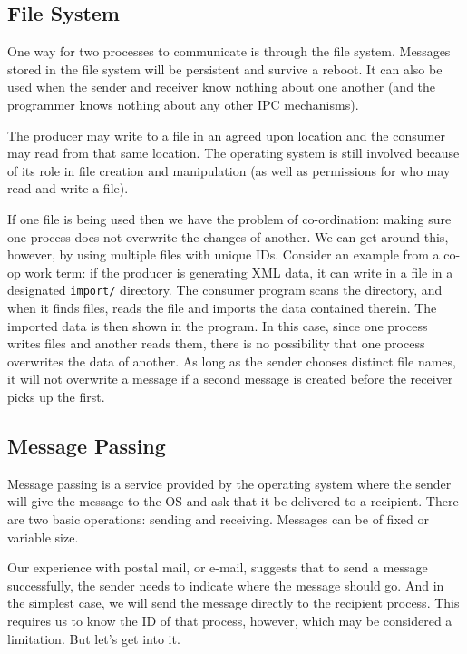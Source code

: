 \subsection*{File System}

One way for two processes to communicate is through the file system. Messages stored in the file system will be persistent and survive a reboot. It can also be used when the sender and receiver know nothing about one another (and the programmer knows nothing about any other IPC mechanisms).

The producer may write to a file in an agreed upon location and the consumer may read from that same location. The operating system is still involved because of its role in file creation and manipulation (as well as permissions for who may read and write a file).

If one file is being used then we have the problem of co-ordination: making sure one process does not overwrite the changes of another. We can get around this, however, by using multiple files with unique IDs. Consider an example from a co-op work term: if the producer is generating XML data, it can write in a file in a designated \texttt{import/} directory. The consumer program scans the directory, and when it finds files, reads the file and imports the data contained therein. The imported data is then shown in the program. In this case, since one process writes files and another reads them, there is no possibility that one process overwrites the data of another. As long as the sender chooses distinct file names, it will not overwrite a message if a second message is created before the receiver picks up the first.

\subsection*{Message Passing}

Message passing is a service provided by the operating system where the sender will give the message to the OS and ask that it be delivered to a recipient. There are two basic operations: sending and receiving. Messages can be of fixed or variable size.

Our experience with postal mail, or e-mail, suggests that to send a message successfully, the sender needs to indicate where the message should go. And in the simplest case, we will send the message directly to the recipient process. This requires us to know the ID of that process, however, which may be considered a limitation. But let's get into it.

